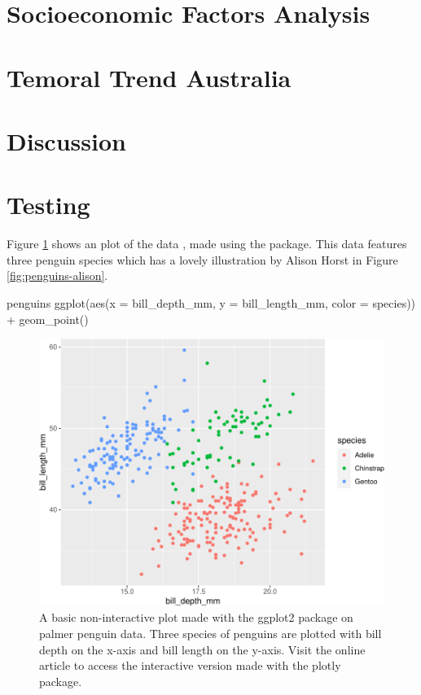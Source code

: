 \hypertarget{socioeconomic-factors-analysis}{%
\section{Socioeconomic Factors
Analysis}\label{socioeconomic-factors-analysis}}

\hypertarget{temoral-trend-australia}{%
\section{Temoral Trend Australia}\label{temoral-trend-australia}}

\hypertarget{discussion}{%
\section{Discussion}\label{discussion}}

\hypertarget{testing}{%
\section{Testing}\label{testing}}

Figure \ref{fig:penguins-ggplot} shows an plot of the
 data \citep{palmerpenguins}, made using the
 package. This data features three penguin species
which has a lovely illustration by Alison Horst in Figure
\ref{fig:penguins-alison}.

\begin{Schunk}
\begin{Sinput}
penguins %
  ggplot(aes(x = bill_depth_mm, y = bill_length_mm,
             color = species)) +
  geom_point()
\end{Sinput}
\begin{figure}
\includegraphics{learningtower_files/figure-latex/penguins-ggplot-1} \caption[A basic non-interactive plot made with the ggplot2 package on palmer penguin data]{A basic non-interactive plot made with the ggplot2 package on palmer penguin data. Three species of penguins are plotted with bill depth on the x-axis and bill length on the y-axis. Visit the online article to access the interactive version made with the plotly package.}\label{fig:penguins-ggplot}
\end{figure}
\end{Schunk}

